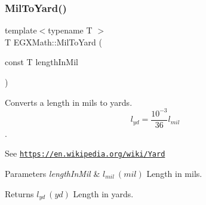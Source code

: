 \subsubsection{\texorpdfstring{Mil\+To\+Yard()}{MilToYard()}}
{\footnotesize\ttfamily template$<$typename T $>$ \\
T E\+G\+X\+Math\+::\+Mil\+To\+Yard (\begin{DoxyParamCaption}\item[{const T}]{length\+In\+Mil }\end{DoxyParamCaption})}



Converts a length in mils to yards. \[ l_{yd}= \frac{10^{-3}}{36} l_{mil} \]. 

See \href{https://en.wikipedia.org/wiki/Yard}{\tt https\+://en.\+wikipedia.\+org/wiki/\+Yard} 
\begin{DoxyParams}{Parameters}
{\em length\+In\+Mil} & $ l_{mil}\ (mil)$ Length in mils. \\
\hline
\end{DoxyParams}
\begin{DoxyReturn}{Returns}
$ l_{yd}\ (yd)$ Length in yards. 
\end{DoxyReturn}
